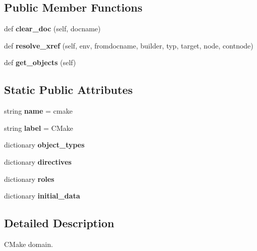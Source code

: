 \subsection*{Public Member Functions}
\begin{DoxyCompactItemize}
\item 
def {\bfseries clear\+\_\+doc} (self, docname)\hypertarget{classcmake_1_1CMakeDomain_a2732fd39e980ef6d09b25eb900e5c4e4}{}\label{classcmake_1_1CMakeDomain_a2732fd39e980ef6d09b25eb900e5c4e4}

\item 
def {\bfseries resolve\+\_\+xref} (self, env, fromdocname, builder, typ, target, node, contnode)\hypertarget{classcmake_1_1CMakeDomain_a7c0d75227bf1e1745d43f6e19943b624}{}\label{classcmake_1_1CMakeDomain_a7c0d75227bf1e1745d43f6e19943b624}

\item 
def {\bfseries get\+\_\+objects} (self)\hypertarget{classcmake_1_1CMakeDomain_a0f5f539734ddf67f8ecf8dafe6003cd6}{}\label{classcmake_1_1CMakeDomain_a0f5f539734ddf67f8ecf8dafe6003cd6}

\end{DoxyCompactItemize}
\subsection*{Static Public Attributes}
\begin{DoxyCompactItemize}
\item 
string {\bfseries name} = \textquotesingle{}cmake\textquotesingle{}\hypertarget{classcmake_1_1CMakeDomain_a1f6d8b71882c94a479574702ce0428f1}{}\label{classcmake_1_1CMakeDomain_a1f6d8b71882c94a479574702ce0428f1}

\item 
string {\bfseries label} = \textquotesingle{}C\+Make\textquotesingle{}\hypertarget{classcmake_1_1CMakeDomain_a9215bbd38d25d788734f83dfc8c7f2bd}{}\label{classcmake_1_1CMakeDomain_a9215bbd38d25d788734f83dfc8c7f2bd}

\item 
dictionary {\bfseries object\+\_\+types}
\item 
dictionary {\bfseries directives}
\item 
dictionary {\bfseries roles}
\item 
dictionary {\bfseries initial\+\_\+data}
\end{DoxyCompactItemize}


\subsection{Detailed Description}
C\+Make domain. 



